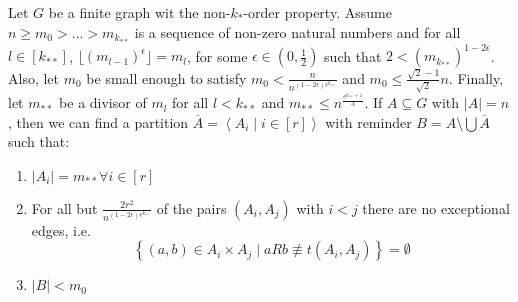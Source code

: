     \lemma[Claim 4.14]\label{existance_of_equitative_partition_with_bound_exceptional_pairs}
        Let $G$ be a finite graph wit the non-$k_{*}$-order property.
        Assume $n \geq m_0 > \dots > m_{k_{**}}$ is a sequence of non-zero natural numbers and for all $l \in [k_{**}]$,
            $\lfloor (m_{l-1})^\epsilon \rfloor = m_l$, for some $\epsilon \in (0, \frac{1}{2})$ such that $2 < (m_{k_{**}})^{1-2\epsilon}$.
        Also, let $m_0$ be small enough to satisfy $m_0 < \frac{n}{n^{(1 - 2\epsilon)\epsilon^{k_{**}}}}$ and
            $m_0 \leq \frac{\sqrt{2}-1}{\sqrt{2}} n$.
        Finally, let $m_{**}$ be a divisor of $m_l$ for all $l < k_{**}$ and $m_{**} \leq n^{\frac{\epsilon^{k_{**}+1}}{3}}$.
        If $A \subseteq G$ with $|A| = n$, then we can find a partition $\overline{A} = \left< A_i \mid i \in [r] \right>$
            with reminder $B = A \setminus \bigcup \overline{A}$ such that:
        \begin{enumerate}
            \item\label{itm:4.14.1} $|A_i| = m_{**} \forall i \in [r]$
            \item\label{itm:4.14.2} For all but $\frac{2r^2}{n^{(1-2\epsilon)\epsilon^{k_{**}}}}$ of the pairs
                $(A_i, A_j)$ with $i<j$ there are no exceptional edges, i.e.
                \[
                    \left\{ (a,b) \in A_i \times A_j \mid a R b \not\equiv t(A_i, A_j) \right\} = \emptyset
                \]
            \item\label{itm:4.14.3} $|B| < m_0$
        \end{enumerate}
